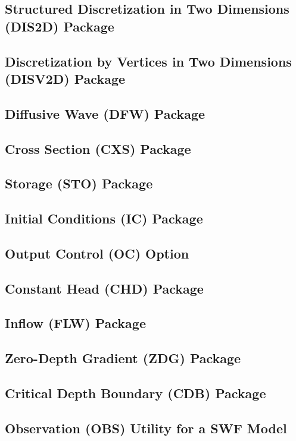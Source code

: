 \newpage
\subsection{Structured Discretization in Two Dimensions (DIS2D) Package}


\newpage
\subsection{Discretization by Vertices in Two Dimensions (DISV2D) Package}


\newpage
\subsection{Diffusive Wave (DFW) Package}


\newpage
\subsection{Cross Section (CXS) Package}


\newpage
\subsection{Storage (STO) Package}


\newpage
\subsection{Initial Conditions (IC) Package}


\newpage
\subsection{Output Control (OC) Option}


\newpage
\subsection{Constant Head (CHD) Package}


\newpage
\subsection{Inflow (FLW) Package}


\newpage
\subsection{Zero-Depth Gradient (ZDG) Package}


\newpage
\subsection{Critical Depth Boundary (CDB) Package}


\newpage
\subsection{Observation (OBS) Utility for a SWF Model}



